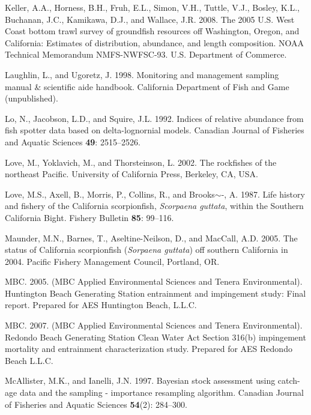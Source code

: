 \documentclass[12pt,]{article}
\begin{document}
\hypertarget{ref-Keller2008}{}
Keller, A.A., Horness, B.H., Fruh, E.L., Simon, V.H., Tuttle, V.J.,
Bosley, K.L., Buchanan, J.C., Kamikawa, D.J., and Wallace, J.R. 2008.
The 2005 U.S. West Coast bottom trawl survey of groundfish resources off
Washington, Oregon, and California: Estimates of distribution,
abundance, and length composition. NOAA Technical Memorandum
NMFS-NWFSC-93. U.S. Department of Commerce.

\hypertarget{ref-Laughlin1998}{}
Laughlin, L., and Ugoretz, J. 1998. Monitoring and management sampling
manual \& scientific aide handbook. California Department of Fish and
Game (unpublished).

\hypertarget{ref-Lo1992}{}
Lo, N., Jacobson, L.D., and Squire, J.L. 1992. Indices of relative
abundance from fish spotter data based on delta-lognornial models.
Canadian Journal of Fisheries and Aquatic Sciences \textbf{49}:
2515--2526.

\hypertarget{ref-Love2002}{}
Love, M., Yoklavich, M., and Thorsteinson, L. 2002. The rockfishes of
the northeast Pacific. University of California Press, Berkeley, CA,
USA.

\hypertarget{ref-Love1987}{}
Love, M.S., Axell, B., Morris, P., Collins, R., and Brooks\(\sim\)-, A.
1987. Life history and fishery of the California scorpionfish,
\emph{Scorpaena guttata}, within the Southern California Bight. Fishery
Bulletin \textbf{85}: 99--116.

\hypertarget{ref-Maunder2005}{}
Maunder, M.N., Barnes, T., Aseltine-Neilson, D., and MacCall, A.D. 2005.
The status of California scorpionfish (\emph{Sorpaena guttata}) off
southern California in 2004. Pacific Fishery Management Council,
Portland, OR.

\hypertarget{ref-MBC2005}{}
MBC. 2005. (MBC Applied Environmental Sciences and Tenera
Environmental). Huntington Beach Generating Station entrainment and
impingement study: Final report. Prepared for AES Huntington Beach,
L.L.C.

\hypertarget{ref-MBC2007}{}
MBC. 2007. (MBC Applied Environmental Sciences and Tenera
Environmental). Redondo Beach Generating Station Clean Water Act Section
316(b) impingement mortality and entrainment characterization study.
Prepared for AES Redondo Beach L.L.C.

\hypertarget{ref-McAllister1997}{}
McAllister, M.K., and Ianelli, J.N. 1997. Bayesian stock assessment
using catch-age data and the sampling - importance resampling algorithm.
Canadian Journal of Fisheries and Aquatic Sciences \textbf{54}(2):
284--300.
\end{document}
